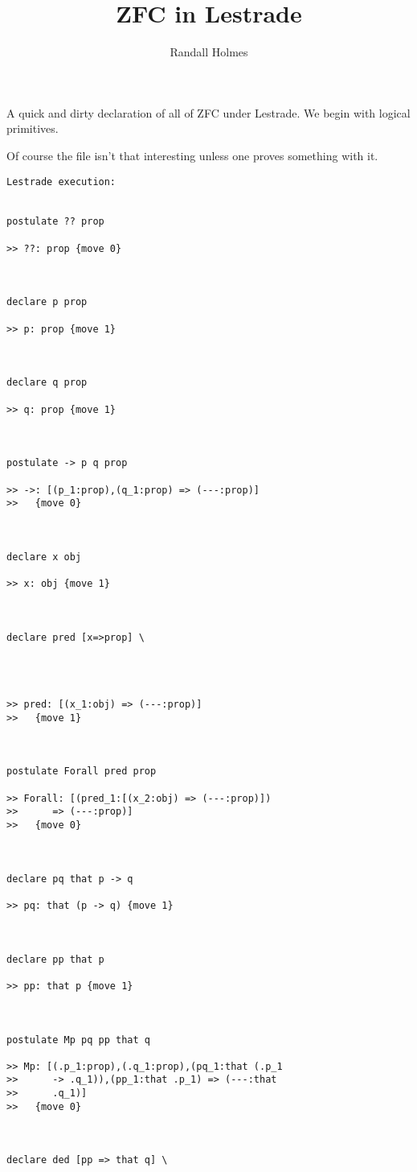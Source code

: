 \documentclass{article}
\title{ZFC in Lestrade}
\author{Randall Holmes}
\begin{document}
\maketitle

A quick and dirty declaration of all of ZFC under Lestrade.  We begin with logical primitives.

Of course the file isn't that interesting unless one proves something with it.

\begin{verbatim}Lestrade execution:


postulate ?? prop

>> ??: prop {move 0}



declare p prop

>> p: prop {move 1}



declare q prop

>> q: prop {move 1}



postulate -> p q prop

>> ->: [(p_1:prop),(q_1:prop) => (---:prop)]
>>   {move 0}



declare x obj

>> x: obj {move 1}



declare pred [x=>prop] \
   



>> pred: [(x_1:obj) => (---:prop)]
>>   {move 1}



postulate Forall pred prop

>> Forall: [(pred_1:[(x_2:obj) => (---:prop)])
>>      => (---:prop)]
>>   {move 0}



declare pq that p -> q

>> pq: that (p -> q) {move 1}



declare pp that p

>> pp: that p {move 1}



postulate Mp pq pp that q

>> Mp: [(.p_1:prop),(.q_1:prop),(pq_1:that (.p_1
>>      -> .q_1)),(pp_1:that .p_1) => (---:that
>>      .q_1)]
>>   {move 0}



declare ded [pp => that q] \
   




\end{verbatim}
\end{document}
